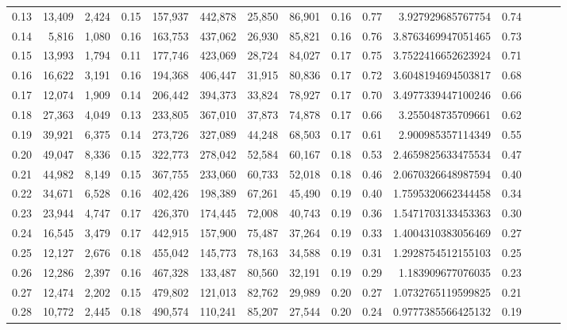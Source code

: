 \begin{tabular}{rrrrrrrrrrrrrrr}
0.13 &  13,409 &  2,424 &  0.15 &  157,937 &  442,878 &   25,850 &   86,901 &  0.16 &  0.77 &       3.927929685767754 &      0.74 \\
0.14 &   5,816 &  1,080 &  0.16 &  163,753 &  437,062 &   26,930 &   85,821 &  0.16 &  0.76 &      3.8763469947051465 &      0.73 \\
0.15 &  13,993 &  1,794 &  0.11 &  177,746 &  423,069 &   28,724 &   84,027 &  0.17 &  0.75 &      3.7522416652623924 &      0.71 \\
0.16 &  16,622 &  3,191 &  0.16 &  194,368 &  406,447 &   31,915 &   80,836 &  0.17 &  0.72 &      3.6048194694503817 &      0.68 \\
0.17 &  12,074 &  1,909 &  0.14 &  206,442 &  394,373 &   33,824 &   78,927 &  0.17 &  0.70 &      3.4977339447100246 &      0.66 \\
0.18 &  27,363 &  4,049 &  0.13 &  233,805 &  367,010 &   37,873 &   74,878 &  0.17 &  0.66 &       3.255048735709661 &      0.62 \\
0.19 &  39,921 &  6,375 &  0.14 &  273,726 &  327,089 &   44,248 &   68,503 &  0.17 &  0.61 &       2.900985357114349 &      0.55 \\
0.20 &  49,047 &  8,336 &  0.15 &  322,773 &  278,042 &   52,584 &   60,167 &  0.18 &  0.53 &      2.4659825633475534 &      0.47 \\
0.21 &  44,982 &  8,149 &  0.15 &  367,755 &  233,060 &   60,733 &   52,018 &  0.18 &  0.46 &      2.0670326648987594 &      0.40 \\
0.22 &  34,671 &  6,528 &  0.16 &  402,426 &  198,389 &   67,261 &   45,490 &  0.19 &  0.40 &      1.7595320662344458 &      0.34 \\
0.23 &  23,944 &  4,747 &  0.17 &  426,370 &  174,445 &   72,008 &   40,743 &  0.19 &  0.36 &      1.5471703133453363 &      0.30 \\
0.24 &  16,545 &  3,479 &  0.17 &  442,915 &  157,900 &   75,487 &   37,264 &  0.19 &  0.33 &      1.4004310383056469 &      0.27 \\
0.25 &  12,127 &  2,676 &  0.18 &  455,042 &  145,773 &   78,163 &   34,588 &  0.19 &  0.31 &      1.2928754512155103 &      0.25 \\
0.26 &  12,286 &  2,397 &  0.16 &  467,328 &  133,487 &   80,560 &   32,191 &  0.19 &  0.29 &       1.183909677076035 &      0.23 \\
0.27 &  12,474 &  2,202 &  0.15 &  479,802 &  121,013 &   82,762 &   29,989 &  0.20 &  0.27 &      1.0732765119599825 &      0.21 \\
0.28 &  10,772 &  2,445 &  0.18 &  490,574 &  110,241 &   85,207 &   27,544 &  0.20 &  0.24 &      0.9777385566425132 &      0.19 \\

\end{tabular}
